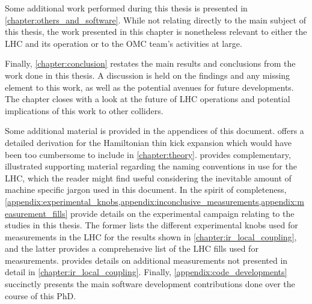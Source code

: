 Some additional work performed during this thesis is presented in \cref{chapter:others_and_software}.
While not relating directly to the main subject of this thesis, the work presented in this chapter is nonetheless relevant to either the \gls{LHC} and its operation or to the \gls{OMC} team's activities at large.

Finally, \cref{chapter:conclusion} restates the main results and conclusions from the work done in this thesis.
A discussion is held on the findings and any missing element to this work, as well as the potential avenues for future developments.
The chapter closes with a look at the future of LHC operations and potential implications of this work to other colliders.

Some additional material is provided in the appendices of this document.
 offers a detailed derivation for the Hamiltonian thin kick expansion which would have been too cumbersome to include in \cref{chapter:theory}.
 provides complementary, illustrated supporting material regarding the naming conventions in use for the \gls{LHC}, which the reader might find useful considering the inevitable amount of machine specific jargon used in this document.
In the spirit of completeness, \cref{appendix:experimental_knobs,appendix:inconclusive_measurements,appendix:measurement_fills} provide details on the experimental campaign relating to the studies in this thesis.
The former lists the different experimental knobs used for measurements in the LHC for the results shown in \cref{chapter:ir_local_coupling}, and the latter provides a comprehensive list of the LHC fills used for measurements.
 provides details on additional measurements not presented in detail in \cref{chapter:ir_local_coupling}.
Finally, \cref{appendix:code_developments} succinctly presents the main software development contributions done over the course of this PhD.

\glsresetall                                     %
